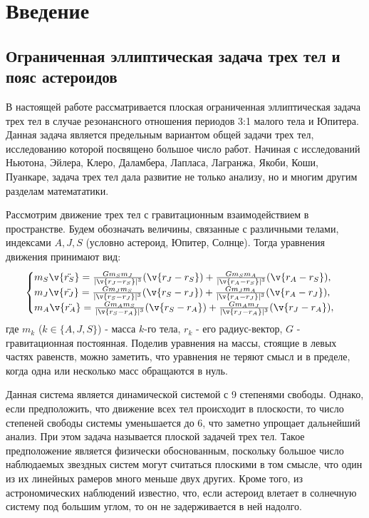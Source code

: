 \section{Введение} 

\subsection{Ограниченная эллиптическая задача трех тел и пояс астероидов}
В настоящей работе рассматривается плоская ограниченная эллиптическая задача трех тел в случае резонансного отношения периодов 3:1 малого тела и Юпитера. Данная задача является предельным вариантом общей задачи трех тел, исследованию которой посвящено большое число работ. Начиная с исследований Ньютона, Эйлера, Клеро, Даламбера, Лапласа, Лагранжа, Якоби, Коши, Пуанкаре, задача трех тел дала развитие не только анализу, но и многим другим разделам математатики. 

Рассмотрим движение трех тел с гравитационным взаимодействием в пространстве. Будем обозначать величины, связанные с различными телами, индексами $A,J,S$ (условно астероид, Юпитер, Солнце). Тогда уравнения движения принимают вид:
\begin{equation*}
 \begin{cases}
   m_S \v{\ddot{r_S}} = 
   \frac{G m_S m_J}{|\v{r_J-r_S}|^3} (\v{r_J-r_S})+
   \frac{G m_S m_A}{|\v{r_A-r_S}|^3} (\v{r_A-r_S}), 
   \\
   m_J \v{\ddot{r_J}} = 
   \frac{G m_J m_S}{|\v{r_S-r_J}|^3} (\v{r_S-r_J})+
   \frac{G m_J m_A}{|\v{r_A-r_J}|^3} (\v{r_A-r_J}),
   \\
   m_A \v{\ddot{r_A}} = 
   \frac{G m_A m_S}{|\v{r_S-r_A}|^3} (\v{r_S-r_A})+
   \frac{G m_A m_J}{|\v{r_J-r_A}|^3} (\v{r_J-r_A}),
 \end{cases}
\end{equation*}
где $m_{k}$ ($k\in \{A, J, S\}$) - масса $k$-го тела, $r_{k}$ - его радиус-вектор, $G$ - гравитационная постоянная. Поделив уравнения на массы, стоящие в левых частях равенств, можно заметить, что уравнения не теряют смысл и в пределе, когда одна или несколько масс обращаются в нуль.

Данная система является динамической системой с 9 степенями свободы. Однако, если предположить, что движение всех тел происходит в плоскости, то число степеней свободы системы уменьшается до 6, что заметно упрощает дальнейший анализ. При этом задача называется плоской задачей трех тел. Такое предположение является физически обоснованным, поскольку большое число наблюдаемых звездных систем могут считаться плоскими в том смысле, что один из их линейных рамеров много меньше двух других. Кроме того, из астрономических наблюдений известно, что, если астероид влетает в солнечную систему под большим углом, то он не задерживается в ней надолго.

